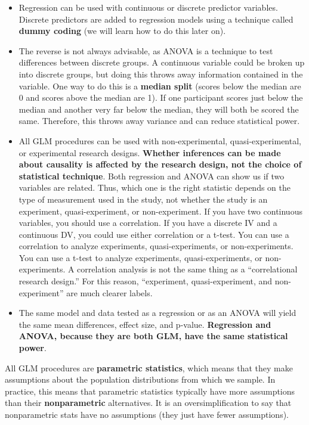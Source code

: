 \documentclass[
]{book}
\begin{document}
\begin{itemize}
\item
  Regression can be used with continuous or discrete predictor variables. Discrete predictors are added to regression models using a technique called \textbf{dummy coding} (we will learn how to do this later on).
\item
  The reverse is not always advisable, as ANOVA is a technique to test differences between discrete groups. A continuous variable could be broken up into discrete groups, but doing this throws away information contained in the variable. One way to do this is a \textbf{median split} (scores below the median are 0 and scores above the median are 1). If one participant scores just below the median and another very far below the median, they will both be scored the same. Therefore, this throws away variance and can reduce statistical power.
\item
  All GLM procedures can be used with non-experimental, quasi-experimental, or experimental research designs. \textbf{Whether inferences can be made about causality is affected by the research design, not the choice of statistical technique}. Both regression and ANOVA can show us if two variables are related. Thus, which one is the right statistic depends on the type of measurement used in the study, not whether the study is an experiment, quasi-experiment, or non-experiment. If you have two continuous variables, you should use a correlation. If you have a discrete IV and a continuous DV, you could use either correlation or a t-test. You can use a correlation to analyze experiments, quasi-experiments, or non-experiments. You can use a t-test to analyze experiments, quasi-experiments, or non-experiments. A correlation analysis is not the same thing as a ``correlational research design.'' For this reason, ``experiment, quasi-experiment, and non-experiment'' are much clearer labels.
\item
  The same model and data tested as a regression or as an ANOVA will yield the same mean differences, effect size, and p-value. \textbf{Regression and ANOVA, because they are both GLM, have the same statistical power}.
\end{itemize}

All GLM procedures are \textbf{parametric statistics}, which means that they make assumptions about the population distributions from which we sample. In practice, this means that parametric statistics typically have more assumptions than their \textbf{nonparametric} alternatives. It is an oversimplification to say that nonparametric stats have no assumptions (they just have fewer assumptions).
\end{document}

